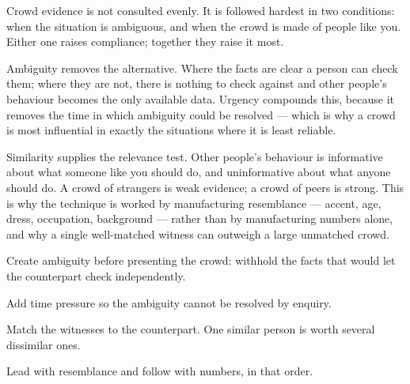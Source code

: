 


\begin{core}
Crowd evidence is not consulted evenly. It is followed hardest in two conditions: when the situation is ambiguous, and when the crowd is made of people like you. Either one raises compliance; together they raise it most.
\end{core}

\begin{mechanism}
Ambiguity removes the alternative. Where the facts are clear a person can check them; where they are not, there is nothing to check against and other people's behaviour becomes the only available data. Urgency compounds this, because it removes the time in which ambiguity could be resolved --- which is why a crowd is most influential in exactly the situations where it is least reliable.

Similarity supplies the relevance test. Other people's behaviour is informative about what someone like you should do, and uninformative about what anyone should do. A crowd of strangers is weak evidence; a crowd of peers is strong. This is why the technique is worked by manufacturing resemblance --- accent, age, dress, occupation, background --- rather than by manufacturing numbers alone, and why a single well-matched witness can outweigh a large unmatched crowd.
\end{mechanism}

\begin{application}
  \item Create ambiguity before presenting the crowd: withhold the facts that would let the counterpart check independently.
  \item Add time pressure so the ambiguity cannot be resolved by enquiry.
  \item Match the witnesses to the counterpart. One similar person is worth several dissimilar ones.
  \item Lead with resemblance and follow with numbers, in that order.
\end{application}

